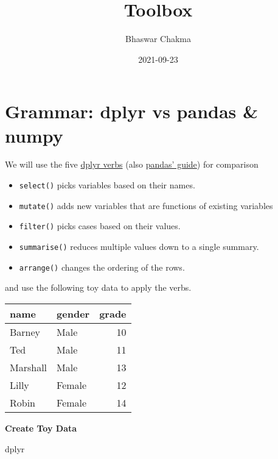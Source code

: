 \documentclass[
]{book}
\title{Toolbox}
\author{Bhaswar Chakma}
\date{2021-09-23}
\begin{document}
\maketitle

{
\setcounter{tocdepth}{1}
\tableofcontents
}
\hypertarget{section}{%
\chapter*{}\label{section}}

\hypertarget{grammar-dplyr-vs-pandas-numpy}{%
\chapter{Grammar: dplyr vs pandas \& numpy}\label{grammar-dplyr-vs-pandas-numpy}}

We will use the five \href{https://dplyr.tidyverse.org/}{dplyr verbs} (also \href{https://pandas.pydata.org/pandas-docs/stable/getting_started/comparison/comparison_with_r.html}{pandas' guide}) for comparison

\begin{itemize}
\item
  \texttt{select()} picks variables based on their names.
\item
  \texttt{mutate()} adds new variables that are functions of existing variables
\item
  \texttt{filter()} picks cases based on their values.
\item
  \texttt{summarise()} reduces multiple values down to a single summary.
\item
  \texttt{arrange()} changes the ordering of the rows.
\end{itemize}

and use the following toy data to apply the verbs.

\begin{longtable}[]{@{}llr@{}}
\toprule
name & gender & grade \\
\midrule
\endhead
Barney & Male & 10 \\
Ted & Male & 11 \\
Marshall & Male & 13 \\
Lilly & Female & 12 \\
Robin & Female & 14 \\
\bottomrule
\end{longtable}

{\textbf{Create Toy Data}}

dplyr
\end{document}
